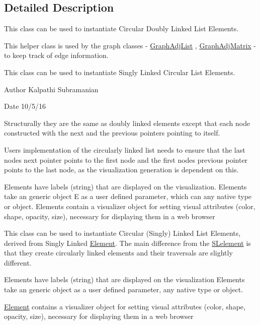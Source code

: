 \subsection{Detailed Description}
This class can be used to instantiate Circular Doubly Linked List Elements. 

This helper class is used by the graph classes -\/ \hyperlink{classbridges_1_1_graph_adj_list}{Graph\+Adj\+List} , \hyperlink{classbridges_1_1_graph_adj_matrix}{Graph\+Adj\+Matrix} -\/ to keep track of edge information.

This class can be used to instantiate Singly Linked Circular List Elements.

\begin{DoxyAuthor}{Author}
Kalpathi Subramanian 
\end{DoxyAuthor}
\begin{DoxyDate}{Date}
10/5/16
\end{DoxyDate}
Structurally they are the same as doubly linked elements except that each node constructed with the next and the previous pointers pointing to itself.

User\textquotesingle{}s implementation of the circularly linked list needs to ensure that the last node\textquotesingle{}s next pointer points to the first node and the first node\textquotesingle{}s previous pointer points to the last node, as the visualization generation is dependent on this.

Elements have labels (string) that are displayed on the visualization. Elements take an generic object E as a user defined parameter, which can any native type or object. Elements contain a visualizer object for setting visual attributes (color, shape, opacity, size), necessary for displaying them in a web browser

This class can be used to instantiate Circular (Singly) Linked List Elements, derived from Singly Linked \hyperlink{classbridges_1_1_element}{Element}. The main difference from the \hyperlink{classbridges_1_1_s_lelement}{S\+Lelement} is that they create circularly linked elements and their traversals are slightly different.

Elements have labels (string) that are displayed on the visualization Elements take an generic object as a user defined parameter, any native type or object.

\hyperlink{classbridges_1_1_element}{Element} contains a visualizer object for setting visual attributes (color, shape, opacity, size), necessary for displaying them in a web browser


